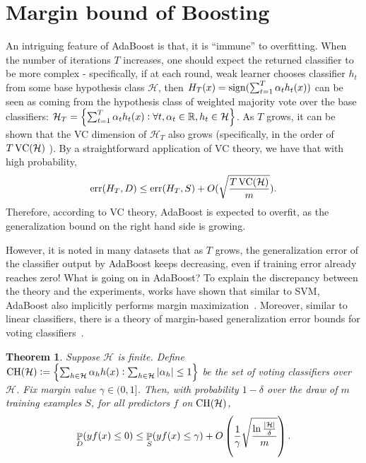 \documentclass{article}
\newtheorem{theorem}{Theorem}
\DeclareMathOperator*{\err}{{\rm err}}
\DeclareMathOperator*{\sign}{{\rm sign}}
\DeclareMathOperator*{\CH}{{\rm CH}}
\DeclareMathOperator*{\VC}{{\rm VC}}
\DeclareMathOperator{\PP}{{\mathbb P}}
\newcommand{\RR}{\mathbb{R}} %
\newcommand{\Hcal}{\mathcal{H}}
\begin{document}
\section{Margin bound of Boosting}
An intriguing feature of AdaBoost is that, it is ``immune'' to overfitting. When the number of iterations $T$ increases, one should expect the returned classifier to be more complex - specifically, if at each round, weak learner chooses classifier $h_t$ from some base hypothesis class $\Hcal$, then
$H_T(x) = \sign(\sum_{t=1}^T \alpha_t h_t(x))$ can be seen as coming from the hypothesis class of weighted majority vote over the base classifiers:
$\Hcal_T = \cbr{\sum_{t=1}^T \alpha_t h_t(x): \forall t, \alpha_t \in \RR, h_t \in \Hcal}$.
As $T$ grows, it can be shown that the VC dimension of $\Hcal_T$ also grows (specifically, in the order of $T \VC(\Hcal)$ ). By a straightforward application of VC theory, we have that with high probability,
\[
  \err(H_T, D) \leq \err(H_T, S) + O(\sqrt{\frac{T\VC(\Hcal)}{m}}).
\]
Therefore, according to VC theory, AdaBoost is expected to overfit, as the generalization bound on the right hand side is growing.

However, it is noted in many datasets that as $T$ grows, the generalization error of the classifier output by AdaBoost keeps decreasing, even if training error already reaches zero! What is going on in AdaBoost? To explain the discrepancy between the theory and the experiments, works have shown that similar to SVM, AdaBoost also implicitly performs margin maximization~\citep{schapire1998boosting}. Moreover, similar to linear classifiers, there is a theory of margin-based generalization error bounds for voting classifiers~\citep{schapire1998boosting,breiman1998arcing,koltchinskii2002empirical,wang2011refined}.

\begin{theorem}
Suppose $\Hcal$ is finite. Define $\CH(\Hcal) := \cbr{\sum_{h \in \Hcal} \alpha_h h(x): \sum_{h \in \Hcal} |\alpha_h| \leq 1}$ be the set of voting classifiers over $\Hcal$. Fix margin value $\gamma \in (0,1]$. Then, with probability $1-\delta$ over the draw of $m$ training examples $S$, for all predictors $f$ on $\CH(\Hcal)$,
\[ \PP_D(y f(x) \leq 0) \leq \PP_S(y f(x) \leq \gamma) + O\del{\frac{1}{\gamma}\sqrt{\frac{\ln\frac{|\Hcal|}{\delta}}{m}}}. \]
\label{thm:margin-1-inf}
\end{theorem}
\end{document}
